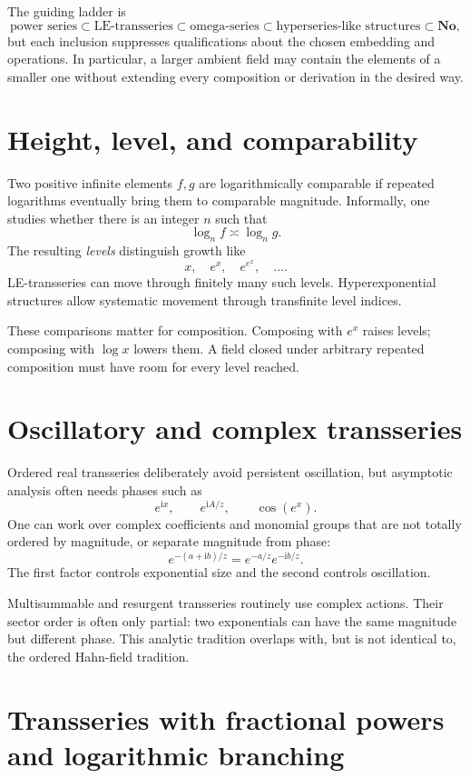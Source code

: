 \documentclass[11pt,openany]{book}
\theoremstyle{definition}
\theoremstyle{plain}
\theoremstyle{remark}
\newcommand{\ii}{\mathrm{i}}
\begin{document}
The guiding ladder is
\[
 \text{power series}
 \subset
 \text{LE-transseries}
 \subset
 \text{omega-series}
 \subset
 \text{hyperseries-like structures}
 \subset
 \mathbf{No},
\]
but each inclusion suppresses qualifications about the chosen embedding and operations. In particular, a larger ambient field may contain the elements of a smaller one without extending every composition or derivation in the desired way.

\section{Height, level, and comparability}

Two positive infinite elements $f,g$ are logarithmically comparable if repeated logarithms eventually bring them to comparable magnitude. Informally, one studies whether there is an integer $n$ such that
\[
 \log_n f\asymp\log_n g.
\]
The resulting \emph{levels} distinguish growth like
\[
 x,
 \quad e^x,
 \quad e^{e^x},
 \quad \dots.
\]
LE-transseries can move through finitely many such levels. Hyperexponential structures allow systematic movement through transfinite level indices.

These comparisons matter for composition. Composing with $e^x$ raises levels; composing with $\log x$ lowers them. A field closed under arbitrary repeated composition must have room for every level reached.

\section{Oscillatory and complex transseries}

Ordered real transseries deliberately avoid persistent oscillation, but asymptotic analysis often needs phases such as
\[
 e^{\ii x},
 \qquad
 e^{\ii A/z},
 \qquad
 \cos(e^x).
\]
One can work over complex coefficients and monomial groups that are not totally ordered by magnitude, or separate magnitude from phase:
\[
 e^{-(a+\ii b)/z}
 =e^{-a/z}e^{-\ii b/z}.
\]
The first factor controls exponential size and the second controls oscillation.

Multisummable and resurgent transseries routinely use complex actions. Their sector order is often only partial: two exponentials can have the same magnitude but different phase. This analytic tradition overlaps with, but is not identical to, the ordered Hahn-field tradition.

\section{Transseries with fractional powers and logarithmic branching}
\end{document}
